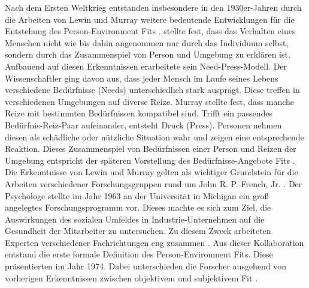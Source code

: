 Nach dem Ersten Weltkrieg entstanden insbesondere in den 1930er-Jahren durch die Arbeiten von Lewin und Murray weitere bedeutende Entwicklungen für die Entstehung des Person-Environment Fits \cite[S. 1]{edwards:1990}. \textcite[S. 11f.]{lewin:1936} stellte fest, dass das Verhalten eines Menschen nicht wie bis dahin angenommen nur durch das Individuum selbst, sondern durch das Zusammenspiel von Person und Umgebung zu erklären ist. Aufbauend auf diesen Erkenntnissen erarbeitete \textcite[S. 38ff.]{murray:1938} sein Need-Press-Modell. Der Wissenschaftler ging davon aus, dass jeder Mensch im Laufe seines Lebens verschiedene Bedürfnisse (Needs) unterschiedlich stark ausprägt. Diese treffen in verschiedenen Umgebungen auf diverse Reize. Murray stellte fest, dass manche Reize mit bestimmten Bedürfnissen kompatibel sind. Trifft ein passendes Bedürfnis-Reiz-Paar aufeinander, entsteht Druck (Press). Personen nehmen diesen als schädliche oder nützliche Situation wahr und zeigen eine entsprechende Reaktion. Dieses Zusammenspiel von Bedürfnissen einer Person und Reizen der Umgebung entspricht der späteren Vorstellung des Bedürfnisse-Angebote Fits \cite[S. 8]{edwards:2008}. \\
Die Erkenntnisse von Lewin und Murray gelten als wichtiger Grundstein für die Arbeiten verschiedener Forschungsgruppen rund um John R. P. French, Jr. \cite[S. 5]{caplan:1993}. Der Psychologe stellte im Jahr 1963 an der Universität in Michigan ein groß angelegtes Forschungsprogramm vor. Dieses machte es sich zum Ziel, die Auswirkungen des sozialen Umfeldes in Industrie-Unternehmen auf die Gesundheit der Mitarbeiter zu untersuchen. Zu diesem Zweck arbeiteten Experten verschiedener Fachrichtungen eng zusammen \cite[S. 1ff.]{french:1963}. Aus dieser Kollaboration entstand die erste formale Definition des Person-Environment Fits. Diese präsentierten \textcite{copingAndAdaption:1974} im Jahr 1974. Dabei unterschieden die Forscher ausgehend von vorherigen Erkenntnissen zwischen objektivem und subjektivem Fit \cite[S. 4f.]{caplan:1993}\cite[S. 1ff.]{french:1966}. \\

